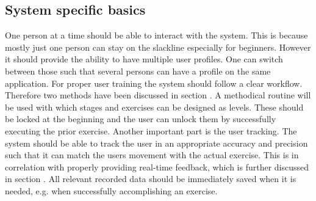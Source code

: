 \subsection{System specific basics}\label{systemBasics}
One person at a time should be able to interact with the system. This is because mostly just one person can stay on the slackline especially for beginners. However it should provide the ability to have multiple user profiles. One can switch between those such that several persons can have a profile on the same application. For proper user training the system should follow a clear workflow. Therefore two methods have been discussed in section \textit{}. A methodical routine will be used with which stages and exercises can be designed as levels. These should be locked at the beginning and the user can unlock them by successfully executing the prior exercise. Another important part is the user tracking. The system should be able to track the user in an appropriate accuracy and precision such that it can match the users movement with the actual exercise. This is in correlation with properly providing real-time feedback, which is further discussed in section \textit{}. All relevant recorded data should be immediately saved when it is needed, e.g. when successfully accomplishing an exercise.

\begin{comment}
- System should be able to track user appropriately
- All relevant data should be immediately saved when it is needed (unlocking exercise/stage, failing/accomplish exercise)
- Information about where the user currently is should be given --> title
- User selection
- Also a possibility to go to the last screen if she misclicks should be given.
\end{comment}